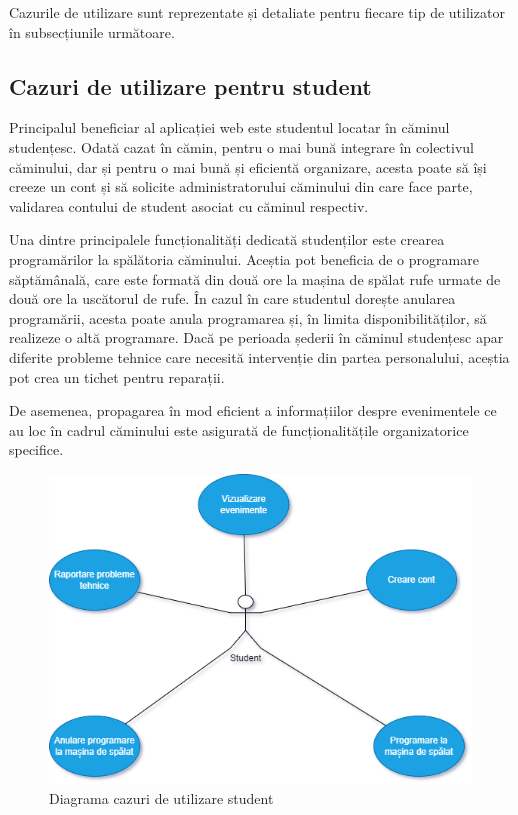 \documentclass[12pt,a4paper]{report}
\theoremstyle{definition}
\theoremstyle{remark}
\begin{document}
\par Cazurile de utilizare sunt reprezentate și detaliate pentru fiecare tip de utilizator în subsecțiunile următoare.

\subsection{Cazuri de utilizare pentru student}
\par Principalul beneficiar al aplicației web este studentul locatar în căminul studențesc. Odată cazat în cămin, pentru o mai bună integrare în colectivul căminului, dar și pentru o mai bună și eficientă organizare, acesta poate să își creeze un cont și să solicite administratorului căminului din care face parte, validarea contului de student asociat cu căminul respectiv.

\par Una dintre principalele funcționalități dedicată studenților este crearea programărilor la spălătoria căminului. Aceștia pot beneficia de o programare săptămânală, care este formată din două ore la mașina de spălat rufe urmate de două ore la uscătorul de rufe. În cazul în care studentul dorește anularea programării, acesta poate anula programarea și, în limita disponibilităților, să realizeze o altă programare. Dacă pe perioada șederii în căminul studențesc apar diferite probleme tehnice care necesită intervenție din partea personalului, aceștia pot crea un tichet pentru reparații.

\par De asemenea, propagarea în mod eficient a informațiilor despre evenimentele ce au loc în cadrul căminului este asigurată de funcționalitățile organizatorice specifice.

\begin{figure}[H]
    \centering
    \includegraphics[width=0.75\linewidth]{resurse/diagrame/use_case_student.drawio.png}
    \caption{Diagrama cazuri de utilizare student}
\end{figure}
\end{document}
